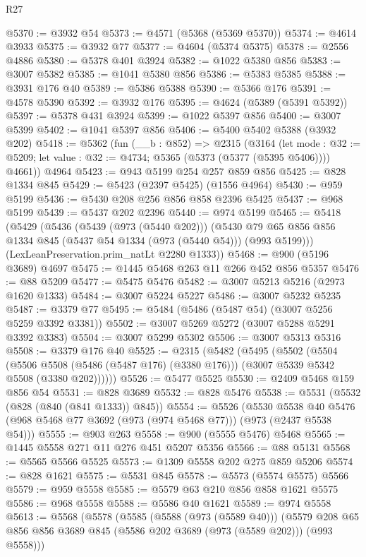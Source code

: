\begin{lexlean}{R27}
\begin{coremodule}
@5370 := @3932 @54
@5373 := @4571 (@5368 (@5369 @5370))
@5374 := @4614 @3933
@5375 := @3932 @77
@5377 := @4604 (@5374 @5375)
@5378 := @2556 @4886
@5380 := @5378 @401 @3924
@5382 := @1022 @5380 @856
@5383 := @3007 @5382
@5385 := @1041 @5380 @856
@5386 := @5383 @5385
@5388 := @3931 @176 @40
@5389 := @5386 @5388
@5390 := @5366 @176
@5391 := @4578 @5390
@5392 := @3932 @176
@5395 := @4624 (@5389 (@5391 @5392))
@5397 := @5378 @431 @3924
@5399 := @1022 @5397 @856
@5400 := @3007 @5399
@5402 := @1041 @5397 @856
@5406 := @5400 @5402 @5388 (@3932 @202)
@5418 := @5362
    (fun (__b : @852) =>
    @2315
      (@3164
        (let mode : @32 := @5209; let value : @32 := @4734; @5365 (@5373 (@5377 (@5395 @5406))))
        @4661))
    @4964
@5423 := @943 @5199 @254 @257 @859 @856
@5425 := @828 @1334 @845
@5429 := @5423 (@2397 @5425) (@1556 @4964)
@5430 := @959 @5199
@5436 := @5430 @208 @256 @856 @858 @2396 @5425
@5437 := @968 @5199
@5439 := @5437 @202 @2396
@5440 := @974 @5199
@5465 := @5418
    (@5429
      (@5436
        (@5439 (@973 (@5440 @202)))
        (@5430 @79 @65 @856 @856 @1334 @845 (@5437 @54 @1334 (@973 (@5440 @54))) (@993 @5199)))
      (LexLeanPreservation.prim_natLt @2280 @1333))
@5468 := @900 (@5196 @3689) @4697
@5475 := @1445 @5468 @263 @11 @266 @452 @856 @5357
@5476 := @88 @5209
@5477 := @5475 @5476
@5482 := @3007 @5213 @5216 (@2973 @1620 @1333)
@5484 := @3007 @5224 @5227
@5486 := @3007 @5232 @5235
@5487 := @3379 @77
@5495 := @5484 (@5486 (@5487 @54) (@3007 @5256 @5259 @3392 @3381))
@5502 := @3007 @5269 @5272 (@3007 @5288 @5291 @3392 @3383)
@5504 := @3007 @5299 @5302
@5506 := @3007 @5313 @5316
@5508 := @3379 @176 @40
@5525 := @2315
    (@5482
      (@5495
        (@5502
          (@5504
            (@5506 @5508 (@5486 (@5487 @176) (@3380 @176)))
            (@3007 @5339 @5342 @5508 (@3380 @202))))))
@5526 := @5477 @5525
@5530 := @2409 @5468 @159 @856 @54
@5531 := @828 @3689
@5532 := @828 @5476
@5538 := @5531 (@5532 (@828 (@840 (@841 @1333)) @845))
@5554 := @5526
    (@5530 @5538 @40 @5476 (@968 @5468 @77 @3692 (@973 (@974 @5468 @77))) (@973 (@2437 @5538 @54)))
@5555 := @903 @263
@5558 := @900 (@5555 @5476) @5468
@5565 := @1445 @5558 @271 @11 @276 @451 @5207 @5356
@5566 := @88 @5131
@5568 := @5565 @5566 @5525
@5573 := @1309 @5558 @202 @275 @859 @5206
@5574 := @828 @1621
@5575 := @5531 @845
@5578 := @5573 (@5574 @5575) @5566
@5579 := @959 @5558
@5585 := @5579 @63 @210 @856 @858 @1621 @5575
@5586 := @968 @5558
@5588 := @5586 @40 @1621
@5589 := @974 @5558
@5613 := @5568
    (@5578
      (@5585
        (@5588 (@973 (@5589 @40)))
        (@5579 @208 @65 @856 @856 @3689 @845 (@5586 @202 @3689 (@973 (@5589 @202))) (@993 @5558)))

\end{coremodule}
\end{lexlean}
